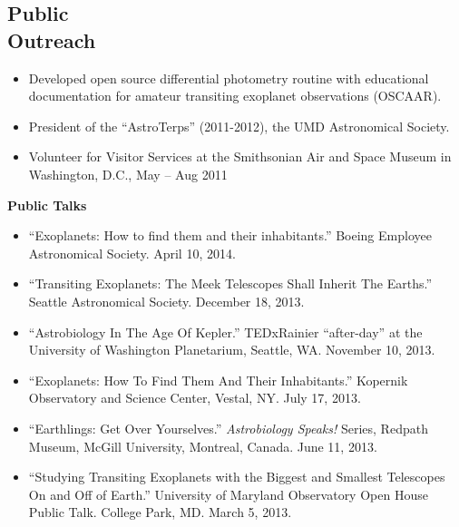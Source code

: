 \documentclass[margin]{res}
\begin{document}
\begin{resume}
\section{Public \\ Outreach}             
            \begin{itemize}   
            \item Developed open source differential photometry routine with educational documentation for amateur transiting exoplanet observations (OSCAAR).\\
	        \item President of the ``AstroTerps'' (2011-2012), the UMD Astronomical Society.
            \item Volunteer for Visitor Services at the Smithsonian Air and Space Museum in Washington, D.C., May -- Aug 2011
            \end{itemize}
	   \textbf{Public Talks}
            \begin{itemize}   
            \item ``Exoplanets: How to find them and their inhabitants.'' Boeing Employee Astronomical Society. April 10, 2014.
            \item ``Transiting Exoplanets: The Meek Telescopes Shall Inherit The Earths.'' Seattle Astronomical Society. December 18, 2013.
            	\item ``Astrobiology In The Age Of Kepler.'' TEDxRainier ``after-day'' at the University of Washington Planetarium, Seattle, WA. November 10, 2013. 
                \item ``Exoplanets: How To Find Them And Their Inhabitants.'' Kopernik Observatory and Science Center, Vestal, NY. July 17, 2013. 
	       \item ``Earthlings: Get Over Yourselves.'' \textit{Astrobiology Speaks!} Series, Redpath Museum, McGill University, Montreal, Canada. June 11, 2013.	   
	       \item ``Studying Transiting Exoplanets with the Biggest and Smallest Telescopes On and Off of Earth.'' University of Maryland Observatory Open House Public Talk. College Park, MD. March 5, 2013.
            \end{itemize}
            

\end{resume}
\end{document}
